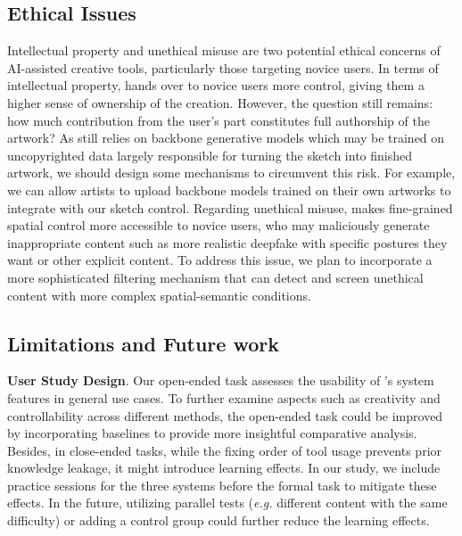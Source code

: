 \subsection{Ethical Issues}
Intellectual property and unethical misuse are two potential ethical concerns of AI-assisted creative tools, particularly those targeting novice users.
In terms of intellectual property, \tool hands over to novice users more control, giving them a higher sense of ownership of the creation.
However, the question still remains: how much contribution from the user's part constitutes full authorship of the artwork?
As \tool still relies on backbone generative models which may be trained on uncopyrighted data largely responsible for turning the sketch into finished artwork, we should design some mechanisms to circumvent this risk.
For example, we can allow artists to upload backbone models trained on their own artworks to integrate with our sketch control.
Regarding unethical misuse, \tool makes fine-grained spatial control more accessible to novice users, who may maliciously generate inappropriate content such as more realistic deepfake with specific postures they want or other explicit content.
To address this issue, we plan to incorporate a more sophisticated filtering mechanism that can detect and screen unethical content with more complex spatial-semantic conditions. 



\subsection{Limitations and Future work}

    \textbf{User Study Design}. Our open-ended task assesses the usability of \tool's system features in general use cases. To further examine aspects such as creativity and controllability across different methods, the open-ended task could be improved by incorporating baselines to provide more insightful comparative analysis. 
    Besides, in close-ended tasks, while the fixing order of tool usage prevents prior knowledge leakage, it might introduce learning effects. In our study, we include practice sessions for the three systems before the formal task to mitigate these effects. In the future, utilizing parallel tests (\textit{e.g.} different content with the same difficulty) or adding a control group could further reduce the learning effects.

